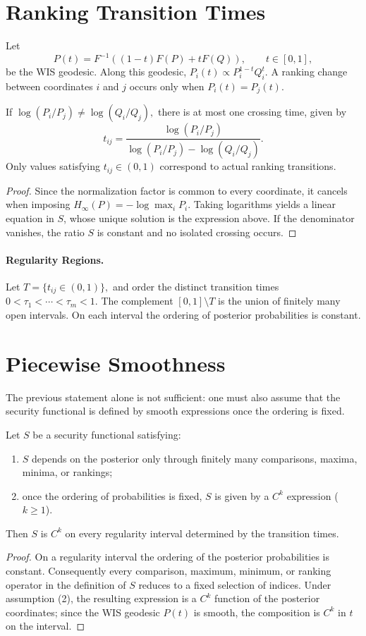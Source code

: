 \section{Ranking Transition Times}\label{ch:sec:ranking-transition-times}
Let
\[ P(t)=F^{-1}\!\left((1-t)F(P)+tF(Q)\right),
\qquad t\in[0,1], \]
be the WIS geodesic.
Along this geodesic,
$P_i(t)\propto P_i^{1-t}Q_i^{t}.$
A ranking change between coordinates \(i\) and \(j\) occurs only when
$P_i(t)=P_j(t).$
\begin{proposition}
\label{ch:prop:17-1}
If
$\log(P_i/P_j)\neq\log(Q_i/Q_j),$
there is at most one crossing time, given by
\[ \boxed{
t_{ij}=
\frac{\log(P_i/P_j)}
{\log(P_i/P_j)-\log(Q_i/Q_j)}.
} \]
Only values satisfying \(t_{ij}\in(0,1)\) correspond to actual
ranking transitions.
\end{proposition}
\begin{proof}
Since the normalization factor is common to every coordinate, it cancels
when imposing
$H_\infty(P)=-\log\max_iP_i.$
Taking logarithms yields a linear equation in \(S\), whose unique solution
is the expression above. If the denominator vanishes, the ratio
\(S\) is constant and no isolated crossing occurs.
\end{proof}
\paragraph{Regularity Regions.}
Let
$T=\{t_{ij}\in(0,1)\},$
and order the distinct transition times
$0<\tau_1<\cdots<\tau_m<1.$
The complement
$[0,1]\setminus T$
is the union of finitely many open intervals.
On each interval the ordering of posterior probabilities is constant.
\section{Piecewise Smoothness}\label{ch:sec:piecewise-smoothness}
The previous statement alone is not sufficient: one must also assume
that the security functional is defined by smooth expressions once the
ordering is fixed.
\begin{theorem}
\label{ch:thm:17-1}
Let \(S\) be a security functional satisfying:
\begin{enumerate}
\item \(S\) depends on the posterior only through finitely many
    comparisons, maxima, minima, or rankings;
\item once the ordering of probabilities is fixed, \(S\) is given by a
    \(C^{k}\) expression (\(k\ge1\)).
\end{enumerate}
Then \(S\) is \(C^{k}\) on every regularity interval determined by the
transition times.
\end{theorem}
\begin{proof}
On a regularity interval the ordering of the posterior probabilities is constant. Consequently every comparison, maximum, minimum, or ranking operator in the definition of \(S\) reduces to a fixed selection of indices. Under assumption (2), the resulting expression is a \(C^{k}\) function of the posterior coordinates; since the WIS geodesic \(P(t)\) is smooth, the composition is \(C^{k}\) in \(t\) on the interval.
\end{proof}
